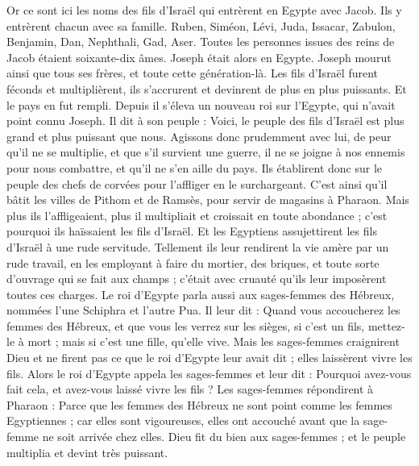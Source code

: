 \begin{multicols}{2}
\VerseOne{}Or ce sont ici les noms des fils d'Israël qui entrèrent en Egypte avec Jacob. Ils y entrèrent chacun avec sa famille.
Ruben, Siméon, Lévi, Juda,
Issacar, Zabulon, Benjamin,
Dan, Nephthali, Gad, Aser.
Toutes les personnes issues des reins de Jacob étaient soixante-dix âmes. Joseph était alors en Egypte.
Joseph mourut ainsi que tous ses frères, et toute cette génération-là.
Les fils d'Israël furent féconds et multiplièrent, ils s’accrurent et devinrent de plus en plus puissants. Et le pays en fut rempli.
Depuis il s'éleva un nouveau roi sur l'Egypte, qui n'avait point connu Joseph.
Il dit à son peuple : Voici, le peuple des fils d'Israël est plus grand et plus puissant que nous.
Agissons donc prudemment avec lui, de peur qu'il ne se multiplie, et que s'il survient une guerre, il ne se joigne à nos ennemis pour nous combattre, et qu'il ne s'en aille du pays.
Ils établirent donc sur le peuple des chefs de corvées pour l'affliger en le surchargeant. C’est ainsi qu’il bâtit les villes de Pithom et de Ramsès, pour servir de magasins à Pharaon.
Mais plus ils l'affligeaient, plus il multipliait et croissait en toute abondance ; c'est pourquoi ils haïssaient les fils d'Israël.
Et les Egyptiens assujettirent les fils d’Israël à une rude servitude.
Tellement ils leur rendirent la vie amère par un rude travail, en les employant à faire du mortier, des briques, et toute sorte d'ouvrage qui se fait aux champs ; c’était avec cruauté qu’ils leur imposèrent toutes ces charges.
Le roi d'Egypte parla aussi aux sages-femmes des Hébreux, nommées l’une Schiphra et l’autre Pua.
Il leur dit : Quand vous accoucherez les femmes des Hébreux, et que vous les verrez sur les sièges, si c'est un fils, mettez-le à mort ; mais si c'est une fille, qu'elle vive.
Mais les sages-femmes craignirent Dieu et ne firent pas ce que le roi d'Egypte leur avait dit ; elles laissèrent vivre les fils.
Alors le roi d'Egypte appela les sages-femmes et leur dit : Pourquoi avez-vous fait cela, et avez-vous laissé vivre les fils ?
Les sages-femmes répondirent à Pharaon : Parce que les femmes des Hébreux ne sont point comme les femmes Egyptiennes ; car elles sont vigoureuses, elles ont accouché avant que la sage-femme ne soit arrivée chez elles.
Dieu fit du bien aux sages-femmes ; et le peuple multiplia et devint très puissant.

\end{multicols}
